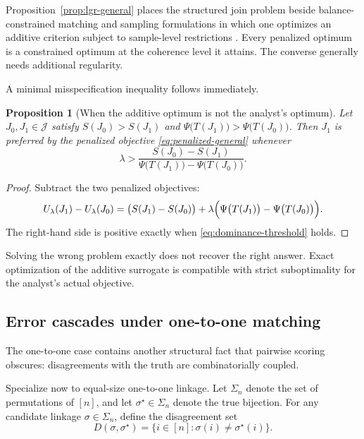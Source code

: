 \documentclass[11pt]{article}
\newtheorem{proposition}{Proposition}[section]
\theoremstyle{remark}
\begin{document}
Proposition~\ref{prop:lgr-general} places the structured join problem beside balance-constrained matching and sampling formulations in which one optimizes an additive criterion subject to sample-level restrictions \citep{Zubizarreta2012,DevilleSarndal1992,DevilleTille2004}. Every penalized optimum is a constrained optimum at the coherence level it attains. The converse generally needs additional regularity.

A minimal misspecification inequality follows immediately.

\begin{proposition}[When the additive optimum is not the analyst's optimum]
\label{prop:dominance-general}
Let $J_0,J_1\in\mathcal{J}$ satisfy $S(J_0)>S(J_1)$ and $\Psi\bigl(T(J_1)\bigr)>\Psi\bigl(T(J_0)\bigr)$. Then $J_1$ is preferred by the penalized objective \eqref{eq:penalized-general} whenever
\begin{equation}
\lambda>
\frac{S(J_0)-S(J_1)}{\Psi\bigl(T(J_1)\bigr)-\Psi\bigl(T(J_0)\bigr)}.
\label{eq:dominance-threshold}
\end{equation}
\end{proposition}

\begin{proof}
Subtract the two penalized objectives:
\[
U_\lambda(J_1)-U_\lambda(J_0)
=
\bigl(S(J_1)-S(J_0)\bigr)
+
\lambda\Bigl(\Psi\bigl(T(J_1)\bigr)-\Psi\bigl(T(J_0)\bigr)\Bigr).
\]
The right-hand side is positive exactly when \eqref{eq:dominance-threshold} holds.
\end{proof}

Solving the wrong problem exactly does not recover the right answer. Exact optimization of the additive surrogate is compatible with strict suboptimality for the analyst's actual objective.

\subsection{Error cascades under one-to-one matching}

The one-to-one case contains another structural fact that pairwise scoring obscures: disagreements with the truth are combinatorially coupled.

Specialize now to equal-size one-to-one linkage. Let $\Sigma_n$ denote the set of permutations of $[n]$, and let $\sigma^\star\in\Sigma_n$ denote the true bijection. For any candidate linkage $\sigma\in\Sigma_n$, define the disagreement set
\[
D(\sigma,\sigma^\star)=\{i\in[n]:\sigma(i)\neq \sigma^\star(i)\}.
\]
\end{document}
